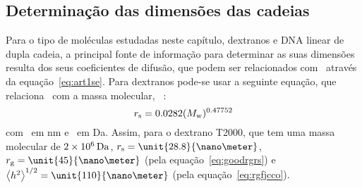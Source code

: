 \subsection{Determinação das dimensões das cadeias}
Para o tipo de moléculas estudadas neste capítulo, dextranos e DNA linear de dupla cadeia, a principal fonte de informação para determinar as suas dimensões resulta dos seus coeficientes de difusão, que podem ser relacionados com \raiostokes\ através da equação~\ref{eq:art1se}. Para dextranos pode-se usar a seguinte equação, que relaciona \raiostokes\ com a massa molecular, \massamolecular\ \cite{xenopoulos}:
%
%
%
\begin{equation}
\label{eq:rsvsmxdextran}
r_{\mathrm{s}}=0.0282(M_\mathrm{w})^{0.47752}
\end{equation}
com \raiostokes\ em nm e \massamolecular\ em Da. Assim, para o dextrano T2000, que tem uma massa molecular de $2\times 10^{6}\,\mathrm{Da}$, $\raiostokes=\unit{28.8}{\nano\meter}$, $\raiogiracao=\unit{45}{\nano\meter}$ (pela equação~\ref{eq:goodrgrs}) e $\distanciah=\unit{110}{\nano\meter}$ (pela equação~\ref{eq:rgfjcco}).

